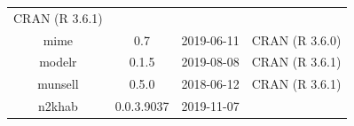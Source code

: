 \documentclass[11pt,]{book}
\begin{document}
\begin{longtable}[]{@{}cccc@{}}
\begin{minipage}[t]{0.36\columnwidth}
CRAN (R 3.6.1)\strut
\end{minipage}\tabularnewline
\begin{minipage}[t]{0.18\columnwidth}\centering\strut
mime\strut
\end{minipage} & \begin{minipage}[t]{0.19\columnwidth}\centering\strut
0.7\strut
\end{minipage} & \begin{minipage}[t]{0.16\columnwidth}\centering\strut
2019-06-11\strut
\end{minipage} & \begin{minipage}[t]{0.36\columnwidth}\centering\strut
CRAN (R 3.6.0)\strut
\end{minipage}\tabularnewline
\begin{minipage}[t]{0.18\columnwidth}\centering\strut
modelr\strut
\end{minipage} & \begin{minipage}[t]{0.19\columnwidth}\centering\strut
0.1.5\strut
\end{minipage} & \begin{minipage}[t]{0.16\columnwidth}\centering\strut
2019-08-08\strut
\end{minipage} & \begin{minipage}[t]{0.36\columnwidth}\centering\strut
CRAN (R 3.6.1)\strut
\end{minipage}\tabularnewline
\begin{minipage}[t]{0.18\columnwidth}\centering\strut
munsell\strut
\end{minipage} & \begin{minipage}[t]{0.19\columnwidth}\centering\strut
0.5.0\strut
\end{minipage} & \begin{minipage}[t]{0.16\columnwidth}\centering\strut
2018-06-12\strut
\end{minipage} & \begin{minipage}[t]{0.36\columnwidth}\centering\strut
CRAN (R 3.6.1)\strut
\end{minipage}\tabularnewline
\begin{minipage}[t]{0.18\columnwidth}\centering\strut
n2khab\strut
\end{minipage} & \begin{minipage}[t]{0.19\columnwidth}\centering\strut
0.0.3.9037\strut
\end{minipage} & \begin{minipage}[t]{0.16\columnwidth}\centering\strut
2019-11-07\strut
\end{minipage} & \begin{minipage}[t]{0.36\columnwidth}\centering\strut

\end{minipage}
\end{longtable}
\end{document}
